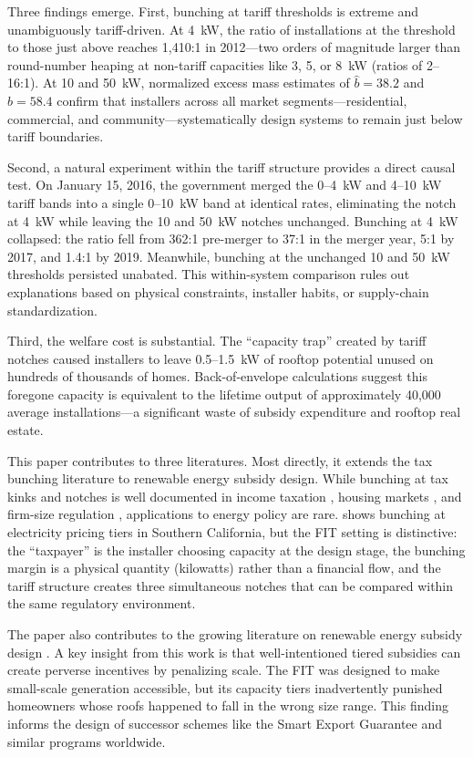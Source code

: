 \documentclass[12pt]{article}
\begin{document}
Three findings emerge. First, bunching at tariff thresholds is extreme and unambiguously tariff-driven. At 4~kW, the ratio of installations at the threshold to those just above reaches 1,410:1 in 2012---two orders of magnitude larger than round-number heaping at non-tariff capacities like 3, 5, or 8~kW (ratios of 2--16:1). At 10 and 50~kW, normalized excess mass estimates of $\hat{b} = 38.2$ and $\hat{b} = 58.4$ confirm that installers across all market segments---residential, commercial, and community---systematically design systems to remain just below tariff boundaries.

Second, a natural experiment within the tariff structure provides a direct causal test. On January 15, 2016, the government merged the 0--4~kW and 4--10~kW tariff bands into a single 0--10~kW band at identical rates, eliminating the notch at 4~kW while leaving the 10 and 50~kW notches unchanged. Bunching at 4~kW collapsed: the ratio fell from 362:1 pre-merger to 37:1 in the merger year, 5:1 by 2017, and 1.4:1 by 2019. Meanwhile, bunching at the unchanged 10 and 50~kW thresholds persisted unabated. This within-system comparison rules out explanations based on physical constraints, installer habits, or supply-chain standardization.

Third, the welfare cost is substantial. The ``capacity trap'' created by tariff notches caused installers to leave 0.5--1.5~kW of rooftop potential unused on hundreds of thousands of homes. Back-of-envelope calculations suggest this foregone capacity is equivalent to the lifetime output of approximately 40,000 average installations---a significant waste of subsidy expenditure and rooftop real estate.

This paper contributes to three literatures. Most directly, it extends the tax bunching literature \citep{saez2010, chetty2011, kleven2013, kleven2016} to renewable energy subsidy design. While bunching at tax kinks and notches is well documented in income taxation \citep{bastani2021}, housing markets \citep{best2018}, and firm-size regulation \citep{garicano2016}, applications to energy policy are rare. \citet{ito2014} shows bunching at electricity pricing tiers in Southern California, but the FIT setting is distinctive: the ``taxpayer'' is the installer choosing capacity at the design stage, the bunching margin is a physical quantity (kilowatts) rather than a financial flow, and the tariff structure creates three simultaneous notches that can be compared within the same regulatory environment.

The paper also contributes to the growing literature on renewable energy subsidy design \citep{borenstein2012, hughes2013, baker2013, aldy2023}. A key insight from this work is that well-intentioned tiered subsidies can create perverse incentives by penalizing scale. The FIT was designed to make small-scale generation accessible, but its capacity tiers inadvertently punished homeowners whose roofs happened to fall in the wrong size range. This finding informs the design of successor schemes like the Smart Export Guarantee and similar programs worldwide.
\end{document}
